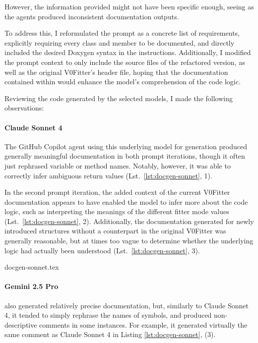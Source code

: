 However, the information provided might not have been specific enough, seeing as the agents produced inconsistent documentation outputs.

To address this, I reformulated the prompt as a concrete list of requirements, explicitly requiring every class and member to be documented, and directly included the desired Doxygen syntax in the instructions.
Additionally, I modified the prompt context to only include the source files of the refactored version, as well as the original V0Fitter's header file, hoping that the documentation contained within would enhance the model's comprehension of the code logic.

\vspace{\baselineskip}
Reviewing the code generated by the selected models, I made the following observations:

\vspace{-1\baselineskip}
\paragraph{Claude Sonnet 4}
The GitHub Copilot agent using this underlying model for generation produced generally meaningful documentation in both prompt iterations, though it often just rephrased variable or method names.
Notably, however, it was able to correctly infer ambiguous return values (Lst.\ \ref{lst:docgen-sonnet}, 1).

In the second prompt iteration, the added context of the current V0Fitter documentation appears to have enabled the model to infer more about the code logic, such as interpreting the meanings of the different fitter mode values (Lst.\ \ref{lst:docgen-sonnet}, 2).
Additionally, the documentation generated for newly introduced structures without a counterpart in the original V0Fitter was generally reasonable, but at times too vague to determine whether the underlying logic had actually been understood (Lst.\ \ref{lst:docgen-sonnet}, 3).

\begin{lstbox}{%
    \label{lst:docgen-sonnet}
  }
  {docgen-sonnet.tex}
\end{lstbox}

\paragraph{Gemini 2.5 Pro} also generated relatively precise documentation, but, similarly to Claude Sonnet 4, it tended to simply rephrase the names of symbols, and produced non-descriptive comments in some instances.
For example, it generated virtually the same comment as Claude Sonnet 4 in Listing \ref{lst:docgen-sonnet}, (3).

